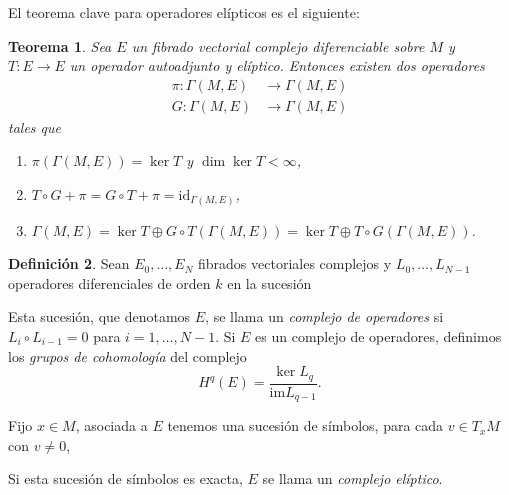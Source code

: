 \documentclass[12pt,a4paper]{article}
\newtheorem{thm}{Teorema}[section]
\theoremstyle{definition} \newtheorem{defn}[thm]{Definición}
\theoremstyle{definition} \newtheorem{ejemplo}[thm]{Ejemplo}
\theoremstyle{definition} \newtheorem{ejercicio}[thm]{Ejercicio}
\theoremstyle{remark} \newtheorem*{obs}{Observación}
\newcommand{\id}{\mathrm{id}}
\begin{document}
   El teorema clave para operadores elípticos es el siguiente:
   \begin{thm}\label{espectral}
     Sea $E$ un fibrado vectorial complejo diferenciable sobre $M$ y $T:E\rightarrow E$ un operador autoadjunto y elíptico. Entonces existen dos operadores
     \begin{align*}
       \pi:  \Gamma(M,E) &\longrightarrow \Gamma(M,E) \\ 
	 G:  \Gamma(M,E) &\longrightarrow \Gamma(M,E) 
       \end{align*}
       tales que
       \begin{enumerate}
	 \item $\pi(\Gamma(M,E))=\ker T$ y $\dim \ker T < \infty$,
	 \item $T\circ G +\pi=G\circ T + \pi = \id_{\Gamma(M,E)}$, 
	 \item $\Gamma(M,E)= \ker T \oplus G\circ T(\Gamma(M,E)) = \ker T \oplus T\circ G(\Gamma(M,E))$.
       \end{enumerate}
   \end{thm}
   \begin{defn}
     Sean $E_0,\dots,E_N$ fibrados vectoriales complejos y $L_0,\dots,L_{N-1}$ operadores diferenciales de orden $k$ en la sucesión
     \begin{center}
     \end{center}
     Esta sucesión, que denotamos $E$, se llama un \emph{complejo de operadores} si $L_i\circ L_{i-1}=0$ para $i=1,\dots,N-1$. Si $E$ es un complejo de operadores, definimos los \emph{grupos de cohomología} del complejo
     \begin{equation*}
       H^q(E)=\frac{\ker L_q}{\mathrm{im} L_{q-1}}.
     \end{equation*}

Fijo $x\in M$, asociada a $E$ tenemos una sucesión de símbolos, para cada $v\in T_xM$ con $v\neq 0$,
     \begin{center}
     \end{center}
     Si esta sucesión de símbolos es exacta, $E$ se llama un \emph{complejo elíptico}.
   \end{defn}
\end{document}
